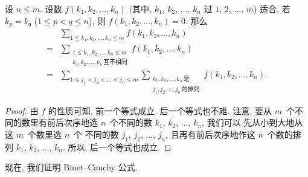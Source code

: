 \documentclass[../libro.tex]{subfiles}
\begin{document}
\begin{theorem}
    设 \(n \leq m\).
    设数 \(f(k_1, k_2, \dots, k_n)\)
    (其中, %
    \(k_1\), \(k_2\), \(\dots\), \(k_n\) 过
    \(1\), \(2\), \(\dots\), \(m\)) %
    适合,
    若 \(k_p = k_q\) (\(1 \leq p < q \leq n\)),
    则 \(f(k_1, k_2, \dots, k_n) = 0\).
    那么
    \begin{align*}
        &
        \sum_{1 \leq k_1, k_2, \dots, k_n \leq m}
        {f(k_1, k_2, \dots, k_n)}
        \\
        = {} &
        \sum_{\substack{
                1 \leq k_1, k_2, \dots, k_n \leq m \\
                k_1, k_2, \dots, k_n\,\text{互不相同}
        }}
        {f(k_1, k_2, \dots, k_n)}
        \\
        = {} &
        \sum_{1 \leq j_1 < j_2 < \dots < j_n \leq m}
        {\sum_{\substack{
                    k_1, k_2, \dots, k_n\,\text{是} \\
                    j_1, j_2, \dots, j_n\,\text{的排列}
            }}
        {f(k_1, k_2, \dots, k_n)}}.
    \end{align*}
\end{theorem}

\begin{proof}
    由 \(f\) 的性质可知, 前一个等式成立.
    后一个等式也不难.
    注意,
    要从 \(m\)~个不同的数里有前后次序地选
    \(n\)~个不同的数
    \(k_1\), \(k_2\), \(\dots\), \(k_n\),
    我们可以%
    先从小到大地从这 \(m\)~个数里选 \(n\)~个%
    不同的数
    \(j_1\), \(j_2\), \(\dots\), \(j_n\),
    且再有前后次序地作这 \(n\)~个数的排列
    \(k_1\), \(k_2\), \(\dots\), \(k_n\).
    所以, 后一个等式也成立.
\end{proof}

现在, 我们证明 Binet--Cauchy 公式.
\end{document}
